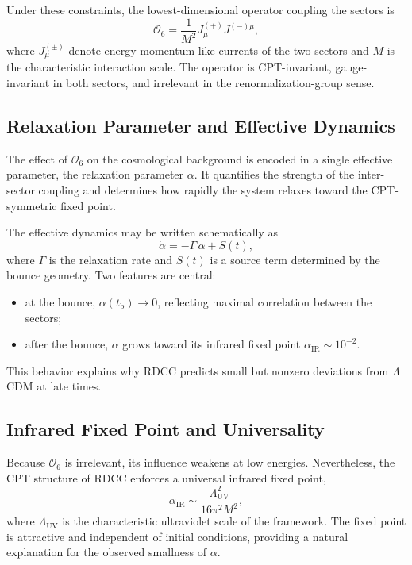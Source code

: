 \documentclass[11pt,a4paper]{article}
\begin{document}
Under these constraints, the lowest-dimensional operator coupling the sectors is
\begin{equation}
    \mathcal{O}_{6}
    = \frac{1}{M^{2}}
      J^{(+)}_{\mu} J^{(-)\mu},
\end{equation}
where $J^{(\pm)}_{\mu}$ denote energy-momentum-like currents of the two sectors and $M$
is the characteristic interaction scale. The operator is CPT-invariant, gauge-invariant
in both sectors, and irrelevant in the renormalization-group sense.

\subsection{Relaxation Parameter and Effective Dynamics}

The effect of $\mathcal{O}_{6}$ on the cosmological background is encoded in a single
effective parameter, the relaxation parameter $\alpha$. It quantifies the strength of the
inter-sector coupling and determines how rapidly the system relaxes toward the
CPT-symmetric fixed point.

The effective dynamics may be written schematically as
\begin{equation}
    \dot{\alpha}
    = -\Gamma\,\alpha + S(t),
\end{equation}
where $\Gamma$ is the relaxation rate and $S(t)$ is a source term determined by the
bounce geometry. Two features are central:

\begin{itemize}
    \item at the bounce, $\alpha(t_{\mathrm{b}}) \to 0$, reflecting maximal correlation between
    the sectors;
    \item after the bounce, $\alpha$ grows toward its infrared fixed point
    $\alpha_{\mathrm{IR}} \sim 10^{-2}$.
\end{itemize}

This behavior explains why RDCC predicts small but nonzero deviations from
$\Lambda$CDM at late times.

\subsection{Infrared Fixed Point and Universality}

Because $\mathcal{O}_{6}$ is irrelevant, its influence weakens at low energies. Nevertheless,
the CPT structure of RDCC enforces a universal infrared fixed point,
\begin{equation}
    \alpha_{\mathrm{IR}}
    \sim
    \frac{\Lambda_{\mathrm{UV}}^{2}}{16\pi^{2} M^{2}},
\end{equation}
where $\Lambda_{\mathrm{UV}}$ is the characteristic ultraviolet scale of the framework. The
fixed point is attractive and independent of initial conditions, providing a natural
explanation for the observed smallness of $\alpha$.
\end{document}
